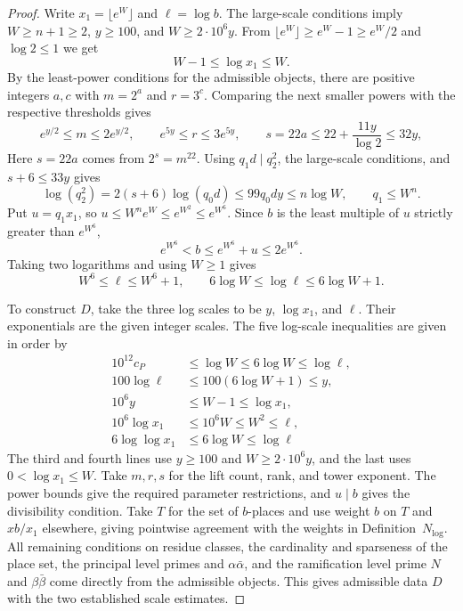 \begin{proof}
Write $x_1=\lfloor e^W\rfloor$ and $\ell=\log b$. The large-scale conditions imply $W\ge n+1\ge2$, $y\ge100$, and $W\ge2\cdot10^6y$. From $\lfloor e^W\rfloor\ge e^W-1\ge e^W/2$ and $\log 2\le1$ we get
\[
 W-1\le\log x_1\le W .
\]
By the least-power conditions for the admissible objects, there are positive integers $a,c$ with $m=2^a$ and $r=3^c$. Comparing the next smaller powers with the respective thresholds gives
\[
 e^{y/2}\le m\le2e^{y/2},\qquad
 e^{5y}\le r\le3e^{5y},\qquad
 s=22a\le22+\frac{11y}{\log2}\le32y ,
\]
Here $s=22a$ comes from $2^s=m^{22}$. Using $q_1d\mid q_2^2$, the large-scale conditions, and $s+6\le33y$ gives
\[
 \log(q_2^2)=2(s+6)\log(q_0d)\le99q_0dy\le n\log W,\qquad
 q_1\le W^n.
\]
Put $u=q_1x_1$, so $u\le W^ne^W\le e^{W^2}\le e^{W^6}$. Since $b$ is the least multiple of $u$ strictly greater than $e^{W^6}$,
\[
 e^{W^6}<b\le e^{W^6}+u\le2e^{W^6}.
\]
Taking two logarithms and using $W\ge1$ gives
\[
 W^6\le \ell\le W^6+1,\qquad
 6\log W\le\log \ell\le 6\log W+1 .
\]

To construct $D$, take the three log scales to be $y$, $\log x_1$, and $\ell$. Their exponentials are the given integer scales. The five log-scale inequalities are given in order by
\[
\begin{aligned}
 10^{12}c_P &\le \log W\le 6\log W\le\log \ell,\\
 100\log \ell &\le100(6\log W+1)\le y,\\
 10^6y &\le W-1\le\log x_1,\\
 10^6\log x_1 &\le10^6W\le W^2\le \ell,\\
 6\log\log x_1 &\le 6\log W\le\log \ell
\end{aligned}
\]
The third and fourth lines use $y\ge100$ and $W\ge2\cdot10^6y$, and the last uses $0<\log x_1\le W$.
Take $m,r,s$ for the lift count, rank, and tower exponent. The power bounds give the required parameter restrictions, and $u\mid b$ gives the divisibility condition. Take $T$ for the set of $b$-places and use weight $b$ on $T$ and $xb/x_1$ elsewhere, giving pointwise agreement with the weights in Definition~$N_{\log}$. All remaining conditions on residue classes, the cardinality and sparseness of the place set, the principal level primes and $\alpha\bar\alpha$, and the ramification level prime $N$ and $\beta\bar\beta$ come directly from the admissible objects. This gives admissible data $D$ with the two established scale estimates.
\end{proof}

